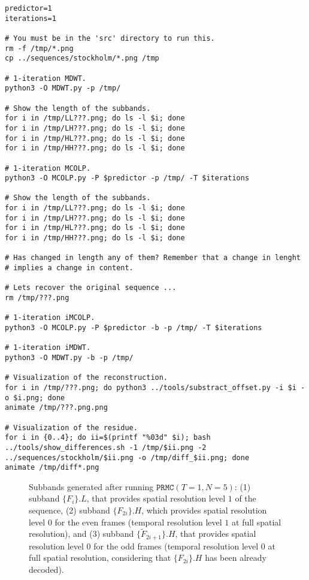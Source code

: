 \begin{verbatim}
predictor=1
iterations=1

# You must be in the 'src' directory to run this.
rm -f /tmp/*.png
cp ../sequences/stockholm/*.png /tmp

# 1-iteration MDWT.
python3 -O MDWT.py -p /tmp/

# Show the length of the subbands.
for i in /tmp/LL???.png; do ls -l $i; done
for i in /tmp/LH???.png; do ls -l $i; done
for i in /tmp/HL???.png; do ls -l $i; done
for i in /tmp/HH???.png; do ls -l $i; done

# 1-iteration MCOLP.
python3 -O MCOLP.py -P $predictor -p /tmp/ -T $iterations

# Show the length of the subbands.
for i in /tmp/LL???.png; do ls -l $i; done
for i in /tmp/LH???.png; do ls -l $i; done
for i in /tmp/HL???.png; do ls -l $i; done
for i in /tmp/HH???.png; do ls -l $i; done

# Has changed in length any of them? Remember that a change in lenght
# implies a change in content.

# Lets recover the original sequence ...
rm /tmp/???.png

# 1-iteration iMCOLP.
python3 -O MCOLP.py -P $predictor -b -p /tmp/ -T $iterations

# 1-iteration iMDWT.
python3 -O MDWT.py -b -p /tmp/

# Visualization of the reconstruction.
for i in /tmp/???.png; do python3 ../tools/substract_offset.py -i $i -o $i.png; done
animate /tmp/???.png.png

# Visualization of the residue.
for i in {0..4}; do ii=$(printf "%03d" $i); bash ../tools/show_differences.sh -1 /tmp/$ii.png -2 ../sequences/stockholm/$ii.png -o /tmp/diff_$ii.png; done
animate /tmp/diff*.png
\end{verbatim}

\begin{figure}
  \centering
  \caption{Subbands generated after running $\mathtt{PRMC}(T=1, N=5)$:
    (1) subband $\{F_i\}.L$, that provides spatial resolution level
    $1$ of the sequence, (2) subband $\{F_{2i}\}.H$, which provides
    spatial resolution level $0$ for the even frames (temporal
    resolution level $1$ at full spatial resolution), and (3) subband
    $\{{\tilde F}_{2i+1}\}.H$, that provides spatial resolution level
    $0$ for the odd frames (temporal resolution level $0$ at full
    spatial resolution, considering that $\{F_{2i}\}.H$ has been
    already decoded).}
  \label{fig:1xPRMC1}
\end{figure}

